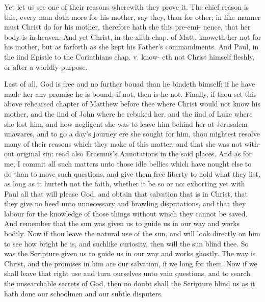 \documentclass{custom}
\begin{document}
Yet let us see one of their reasons wherewith they prove 
it. The chief reason is this, every man doth more for his 
mother, say they, than for other; in like manner must 
Christ do for his mother, therefore hath she this pre-emi- 
nence, that her body is in heaven. And yet Christ, in the 
xiith chap. of Matt. knoweth her not for his mother, but 
as farforth as she kept his Father's commandments. And 
Paul, in the iind Epistle to the Corinthians chap. v. know- 
eth not Christ himself fleshly, or after a worldly purpose. 

Last of all, God is free aud no further bouad than he 
bindeth bimself: if he have made her any promise he is 
bound; if not, then is he not. Finally, if thou set this 
above rehearsed chapter of Matthew before thee where Christ 
would not know his mother, and the iind of John where 
he rebuked her, and the iind of Luke where she lost him, 
and how negligent she was to leave him behind her at 
Jerusalem unawares, and to go a day's journey ere she 
sought for him, thou mightest resolve many of their reasons 
which they make of this matter, and that she was not with- 
out original sin: read also Erasmus's Annotations in the 
said places. And as for me, I commit all such matters 
unto those idle bellies which have nought else to do than 
to move such questions, and give them free liberty to hold 
what they list, as long as it hurteth not the faith, whether 
it be so or no: exhorting yet with Paul all that will please 
God, and obtain that salvation that is in Christ, that they 
give no heed unto unnecessary and brawling disputations, 
and that they labour for the knowledge of those things 
without winch they cannot be saved. And remember that 
the sun was given us to guide us in our way and works 
bodily. Now if thou leave the natural use of the sun, and 
will look directly on him to see how bright he is, and suchlike 
curiosity, then will the sun blind thee. So was the Scripture 
given us to guide us in our way and works ghostly. The 
way is Christ, and the promises in him are our salvation, if we 
long for them. Now if we shall leave that right use and turn 
ourselves unto vain questions, and to search the unsearchable 
secrets of God, then no doubt shall the Scripture blind us 
as it hath done our schoolmen and our subtle disputers. 
\end{document}

